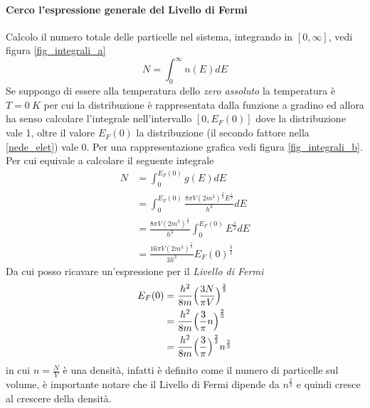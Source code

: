 \paragraph{Cerco l'espressione generale del Livello di Fermi}
Calcolo il numero totale delle particelle nel sistema, integrando in $[0, \infty]$, vedi figura \ref{fig_integrali_a}
\begin{equation}
N = \int_0^{\infty} n(E)dE
\end{equation}
Se suppongo di essere alla temperatura dello \textit{zero assoluto} la temperatura è $T=\SI{0}{K}$ per cui la distribuzione è rappresentata dalla funzione a gradino ed allora ha senso calcolare l'integrale nell'intervallo $[0, E_F(0)]$ dove la distribuzione vale 1, oltre il valore $E_F(0)$ la distribuzione (il secondo fattore nella \ref{nede_elet}) vale 0.
Per una rappresentazione grafica vedi figura \ref{fig_integrali_b}.
Per cui equivale a calcolare il seguente integrale
\begin{equation}
\begin{split}
N & = \int_0^{E_F(0)} g(E)dE \\
& = \int_0^{E_F(0)} \frac{8 \pi V (2m^3)^{\frac{1}{2}} E^{\frac{1}{2}}}{h^3} dE \\
& = \frac{8 \pi V (2m^3)^{\frac{1}{2}}}{h^3} \int_0^{E_F(0)} E^{\frac{1}{2}} dE \\
& = \frac{16 \pi V (2m^3)^{\frac{1}{2}}}{3 h^3} E_F(0)^{\frac{3}{2}}
\label{num_parti_N}
\end{split}
\end{equation}
Da cui posso ricavare un'espressione per il \textit{Livello di Fermi}
\begin{equation}
\begin{split}
E_F(0) & = \frac{h^2}{8m}\Bigl(  \frac{3N}{\pi V}  \Bigr)^{ \frac{2}{3} } \\
& = \frac{h^2}{8m}\Bigl(  \frac{3}{\pi} n  \Bigr)^{ \frac{2}{3} } \\
& = \frac{h^2}{8m}\Bigl(  \frac{3}{\pi}  \Bigr)^{ \frac{2}{3} } n^{ \frac{2}{3} }
\end{split}
\end{equation}
in cui $n=\frac{N}{V}$ è una densità, infatti è definito come il numero di particelle sul volume, è importante notare che il Livello di Fermi dipende da $n^{ \frac{2}{3} }$ e quindi cresce al crescere della densità.


